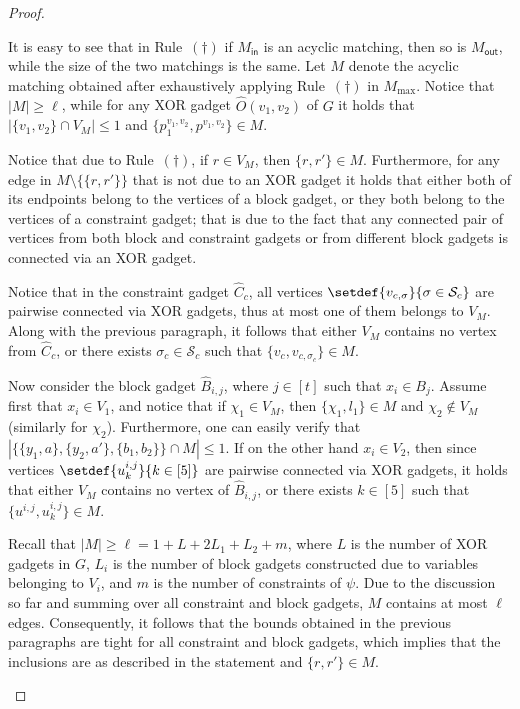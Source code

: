 \begin{proof}
\begin{nestedproof}
\begin{claimproof}
                It is easy to see that in Rule~$(\dagger)$ if $M_{\mathsf{in}}$ is an acyclic matching,
                then so is $M_{\mathsf{out}}$, while the size of the two matchings is the same.
                Let $M$ denote the acyclic matching obtained after exhaustively applying Rule~$(\dagger)$ in $M_{\max}$.
                Notice that $|M| \ge \ell$, while for any XOR gadget $\hat{O}(v_1,v_2)$ of $G$ it holds that $|\{v_1,v_2\} \cap V_M| \le 1$
                and $\{p^{v_1,v_2}_1,p^{v_1,v_2}\} \in M$.

                Notice that due to Rule~$(\dagger)$, if $r \in V_M$, then $\{r,r'\} \in M$.
                Furthermore, for any edge in $M \setminus \{\{r,r'\}\}$ that is not due to an XOR gadget
                it holds that either both of its endpoints belong to the vertices of a block gadget,
                or they both belong to the vertices of a constraint gadget;
                that is due to the fact that any connected pair of vertices from both block and constraint gadgets
                or from different block gadgets is connected via an XOR gadget.

                Notice that in the constraint gadget $\hat{C}_c$,
                all vertices $\setdef{v_{c,\sigma}}{\sigma \in \mathcal{S}_c}$ are pairwise connected via XOR gadgets,
                thus at most one of them belongs to $V_M$.
                Along with the previous paragraph, it follows that either $V_M$ contains no vertex from $\hat{C}_c$,
                or there exists $\sigma_c \in \mathcal{S}_c$ such that $\{v_c,v_{c,\sigma_c}\} \in M$.

                Now consider the block gadget $\hat{B}_{i,j}$, where $j \in [t]$ such that $x_i \in B_j$.
                Assume first that $x_i \in V_1$,
                and notice that if $\chi_1 \in V_M$, then $\{\chi_1,l_1\} \in M$ and $\chi_2 \notin V_M$ (similarly for $\chi_2$).
                Furthermore, one can easily verify that $|\{\{ y_1, a \}, \{ y_2, a' \}, \{ b_1, b_2 \}\} \cap M| \le 1$.
                If on the other hand $x_i \in V_2$, then
                since vertices $\setdef{u^{i,j}_k}{k \in [5]}$ are pairwise connected via XOR gadgets,
                it holds that either $V_M$ contains no vertex of $\hat{B}_{i,j}$,
                or there exists $k \in [5]$ such that $\{u^{i,j}, u^{i,j}_k\} \in M$.

                Recall that $|M| \ge \ell = 1 + L + 2L_1 + L_2 + m$,
                where $L$ is the number of XOR gadgets in $G$,
                $L_i$ is the number of block gadgets constructed due to variables belonging to $V_i$,
                and $m$ is the number of constraints of $\psi$.
                Due to the discussion so far and summing over all constraint and block gadgets,
                $M$ contains at most $\ell$ edges.
                Consequently, it follows that the bounds obtained in the previous paragraphs are tight for all constraint and block gadgets,
                which implies that the inclusions are as described in the statement and $\{r,r'\} \in M$.
            \end{claimproof}



\end{nestedproof}
\end{proof}
